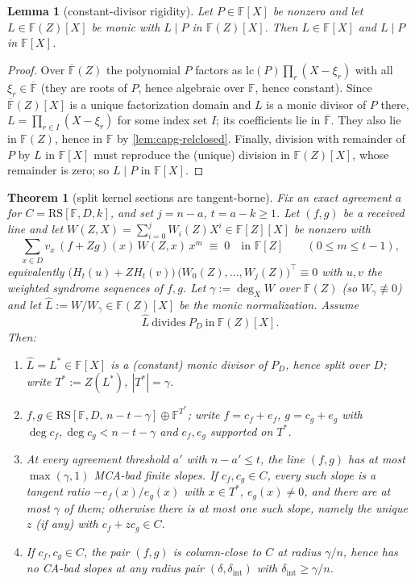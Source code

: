 \documentclass[11pt]{article}
\newtheorem{theorem}{Theorem}[section]
\newtheorem{lemma}[lemma]{Lemma}
\theoremstyle{definition}
\theoremstyle{remark}
\newcommand{\F}{\mathbb{F}}
\begin{document}
\begin{lemma}[constant-divisor rigidity]\label{lem:capg-constdiv}
Let $P\in\F[X]$ be nonzero and let $L\in\F(Z)[X]$ be monic with
$L\mid P$ in $\F(Z)[X]$.  Then $L\in\F[X]$ and $L\mid P$ in $\F[X]$.
\end{lemma}

\begin{proof}
Over $\overline{\F}(Z)$ the polynomial $P$ factors as
$\mathrm{lc}(P)\prod_r(X-\xi_r)$ with all $\xi_r\in\overline{\F}$ (they are
roots of $P$, hence algebraic over $\F$, hence constant).  Since
$\overline{\F}(Z)[X]$ is a unique factorization domain and $L$ is a monic
divisor of $P$ there, $L=\prod_{r\in I}(X-\xi_r)$ for some index set $I$;
its coefficients lie in $\overline{\F}$.  They also lie in $\F(Z)$, hence in
$\F$ by \cref{lem:capg-relclosed}.  Finally, division with remainder of $P$
by $L$ in $\F[X]$ must reproduce the (unique) division in $\F(Z)[X]$, whose
remainder is zero; so $L\mid P$ in $\F[X]$.
\end{proof}

\begin{theorem}[split kernel sections are tangent-borne]\label{thm:capg-tangentborne}
Fix an exact agreement $a$ for $C=\mathrm{RS}[\F,D,k]$, and set $j=n-a$,
$t=a-k\geq 1$.  Let $(f,g)$ be a received line and let
$W(Z,X)=\sum_{i=0}^{j}W_i(Z)X^i\in\F[Z][X]$ be nonzero with
\begin{equation}\label{eq:capg-pairing}
\sum_{x\in D} v_x\,(f+Zg)(x)\,W(Z,x)\,x^{m}\;\equiv\;0 \quad\text{in }\F[Z]
\qquad (0\leq m\leq t-1),
\end{equation}
equivalently $\big(H_t(u)+ZH_t(v)\big)\,\big(W_0(Z),\dots,W_j(Z)\big)^{\!\top}\equiv 0$
with $u,v$ the weighted syndrome sequences of $f,g$.  Let
$\gamma:=\deg_X W$ over $\F(Z)$ (so $W_\gamma\not\equiv 0$) and let
$\widehat{L}:=W/W_\gamma\in\F(Z)[X]$ be the monic normalization.  Assume
\[
\widehat{L}\ \text{divides}\ P_D\ \text{in}\ \F(Z)[X].
\]
Then:
\begin{enumerate}[label=(\roman*)]
\item $\widehat{L}=L^{*}\in\F[X]$ is a (constant) monic divisor of $P_D$,
hence split over $D$; write $T^{*}:=Z(L^{*})$, $|T^{*}|=\gamma$.
\item $f,g\in \mathrm{RS}[\F,D,\,n-t-\gamma]\oplus\F^{T^{*}}$; write
$f=c_f+e_f$, $g=c_g+e_g$ with $\deg c_f,\deg c_g<n-t-\gamma$ and
$e_f,e_g$ supported on $T^{*}$.
\item At every agreement threshold $a'$ with $n-a'\leq t$, the line $(f,g)$
has at most $\max(\gamma,1)$ MCA-bad finite slopes.  If $c_f,c_g\in C$,
every such slope is a tangent ratio $-e_f(x)/e_g(x)$ with $x\in T^{*}$,
$e_g(x)\neq 0$, and there are at most $\gamma$ of them; otherwise there is at
most one such slope, namely the unique $z$ (if any) with $c_f+zc_g\in C$.
\item If $c_f,c_g\in C$, the pair $(f,g)$ is column-close to $C$ at radius
$\gamma/n$, hence has no CA-bad slopes at any radius pair
$(\delta,\delta_{\mathrm{int}})$ with $\delta_{\mathrm{int}}\geq\gamma/n$.
\end{enumerate}
\end{theorem}
\end{document}
